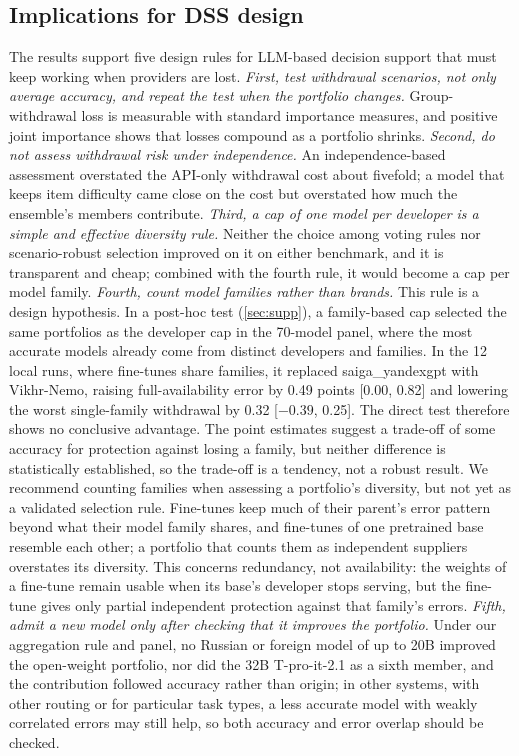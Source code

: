 \documentclass[preprint,12pt,authoryear]{elsarticle}
\begin{document}
\subsection{Implications for DSS design}
The results support five design rules for LLM-based decision support that must keep working when providers are lost. \emph{First, test withdrawal scenarios, not only average accuracy, and repeat the test when the portfolio changes.} Group-withdrawal loss is measurable with standard importance measures, and positive joint importance shows that losses compound as a portfolio shrinks. \emph{Second, do not assess withdrawal risk under independence.} An independence-based assessment overstated the API-only withdrawal cost about fivefold; a model that keeps item difficulty came close on the cost but overstated how much the ensemble's members contribute. \emph{Third, a cap of one model per developer is a simple and effective diversity rule.} Neither the choice among voting rules nor scenario-robust selection improved on it on either benchmark, and it is transparent and cheap; combined with the fourth rule, it would become a cap per model family. \emph{Fourth, count model families rather than brands.} This rule is a design hypothesis. In a post-hoc test (\ref{sec:supp}), a family-based cap selected the same portfolios as the developer cap in the 70-model panel, where the most accurate models already come from distinct developers and families. In the 12 local runs, where fine-tunes share families, it replaced saiga\_yandexgpt with Vikhr-Nemo, raising full-availability error by 0.49 points [0.00, 0.82] and lowering the worst single-family withdrawal by 0.32 [$-0.39$, 0.25]. The direct test therefore shows no conclusive advantage. The point estimates suggest a trade-off of some accuracy for protection against losing a family, but neither difference is statistically established, so the trade-off is a tendency, not a robust result. We recommend counting families when assessing a portfolio's diversity, but not yet as a validated selection rule. Fine-tunes keep much of their parent's error pattern beyond what their model family shares, and fine-tunes of one pretrained base resemble each other; a portfolio that counts them as independent suppliers overstates its diversity. This concerns redundancy, not availability: the weights of a fine-tune remain usable when its base's developer stops serving, but the fine-tune gives only partial independent protection against that family's errors. \emph{Fifth, admit a new model only after checking that it improves the portfolio.} Under our aggregation rule and panel, no Russian or foreign model of up to 20B improved the open-weight portfolio, nor did the 32B T-pro-it-2.1 as a sixth member, and the contribution followed accuracy rather than origin; in other systems, with other routing or for particular task types, a less accurate model with weakly correlated errors may still help, so both accuracy and error overlap should be checked.
\end{document}
